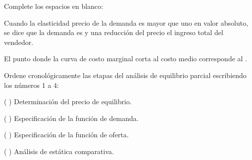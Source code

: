 \documentclass{academic-exam}
\begin{document}
\begin{pregunta}[3]
Complete los espacios en blanco:
\begin{apartados}
  \item Cuando la elasticidad precio de la demanda es mayor que uno en
        valor absoluto, se dice que la demanda es
        \completar[elástica]{3.2cm} y una reducción del precio
        \completar[aumenta]{3.2cm} el ingreso total del vendedor.
  \item El punto donde la curva de costo marginal corta al costo medio
        corresponde al .
\end{apartados}
\end{pregunta}

\begin{pregunta}[3]
Ordene cronológicamente las etapas del análisis de equilibrio parcial
escribiendo los números 1 a 4:
\begin{apartados}
  \item (\,\completar[3]{0.9cm}\,) Determinación del precio de equilibrio.
  \item (\,\completar[1]{0.9cm}\,) Especificación de la función de demanda.
  \item (\,\completar[2]{0.9cm}\,) Especificación de la función de oferta.
  \item (\,\completar[4]{0.9cm}\,) Análisis de estática comparativa.
\end{apartados}
\end{pregunta}

\findelexamen
\end{document}
